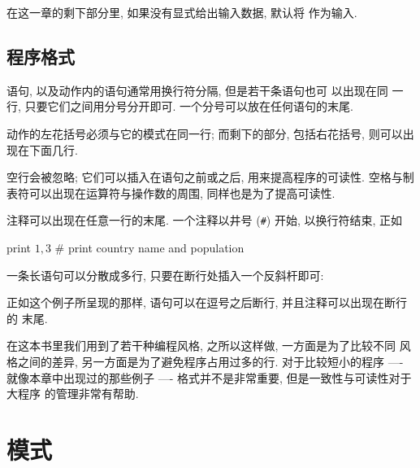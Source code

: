 在这一章的剩下部分里, 如果没有显式给出输入数据, 默认将 
作为输入.

\subsection*{程序格式}
\label{subsec:program_format}

\patact 语句, 以及动作内的语句通常用换行符分隔, 但是若干条语句也可
以出现在同
一行, 只要它们之间用分号分开即可. 一个分号可以放在任何语句的末尾.

动作的左花括号必须与它的模式在同一行; 而剩下的部分, 包括右花括号, 则可以出
现在下面几行.

空行会被忽略; 它们可以插入在语句之前或之后, 用来提高程序的可读性. 空格与制
表符可以出现在运算符与操作数的周围, 同样也是为了提高可读性.

注释可以出现在任意一行的末尾. 一个注释以井号 (\verb'#') 开始,
以换行符结束, 正如
\begin{awkcode}
    { print $1, $3 }    # print country name and population
\end{awkcode}

一条长语句可以分散成多行, 只要在断行处插入一个反斜杆即可:
正如这个例子所呈现的那样, 语句可以在逗号之后断行, 并且注释可以出现在断行的
末尾.

在这本书里我们用到了若干种编程风格, 之所以这样做, 一方面是为了比较不同
风格之间的差异, 另一方面是为了避免程序占用过多的行. 对于比较短小的程序
---- 就像本章中出现过的那些例子 ----
格式并不是非常重要, 但是一致性与可读性对于大程序
的管理非常有帮助.

\section{模式}
\label{sec:patterns}

